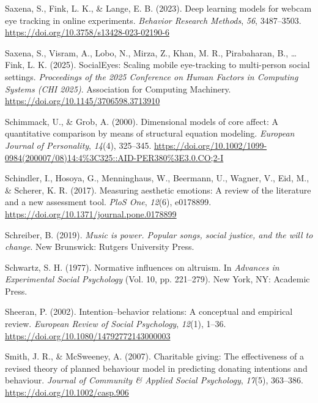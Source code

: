 \documentclass[
  man,floatsintext]{apa6}
\newlength{\cslhangindent}
\newenvironment{CSLReferences}[2] %
 {\begin{list}{}{%
  \setlength{\itemindent}{0pt}
  \setlength{\leftmargin}{0pt}
  \setlength{\parsep}{0pt}
  \ifodd #1
   \setlength{\leftmargin}{\cslhangindent}
   \setlength{\itemindent}{-1\cslhangindent}
  \fi
  \setlength{\itemsep}{#2\baselineskip}}}
 {\end{list}}
\begin{document}
\begin{CSLReferences}{1}{0}
Saxena, S., Fink, L. K., \& Lange, E. B. (2023). Deep learning models for webcam eye tracking in online experiments. \emph{Behavior Research Methods}, \emph{56}, 3487--3503. \url{https://doi.org/10.3758/s13428-023-02190-6}

Saxena, S., Visram, A., Lobo, N., Mirza, Z., Khan, M. R., Pirabaharan, B., \ldots{} Fink, L. K. (2025). {SocialEyes}: {Scaling} mobile eye-tracking to multi-person social settings. \emph{Proceedings of the 2025 {Conference} on {Human} {Factors} in {Computing} {Systems} ({CHI} 2025)}. Association for Computing Machinery. \url{https://doi.org/10.1145/3706598.3713910}

Schimmack, U., \& Grob, A. (2000). Dimensional models of core affect: A quantitative comparison by means of structural equation modeling. \emph{European Journal of Personality}, \emph{14}(4), 325--345. \url{https://doi.org/10.1002/1099-0984(200007/08)14:4\%3C325::AID-PER380\%3E3.0.CO;2-I}

Schindler, I., Hosoya, G., Menninghaus, W., Beermann, U., Wagner, V., Eid, M., \& Scherer, K. R. (2017). Measuring aesthetic emotions: {A} review of the literature and a new assessment tool. \emph{PloS One}, \emph{12}(6), e0178899. \url{https://doi.org/10.1371/journal.pone.0178899}

Schreiber, B. (2019). \emph{Music is power. {Popular} songs, social justice, and the will to change}. New Brunswick: Rutgers University Press.

Schwartz, S. H. (1977). Normative influences on altruism. In \emph{Advances in {Experimental} {Social} {Psychology}} (Vol. 10, pp. 221--279). New York, NY: Academic Press.

Sheeran, P. (2002). Intention--behavior relations: {A} conceptual and empirical review. \emph{European Review of Social Psychology}, \emph{12}(1), 1--36. \url{https://doi.org/10.1080/14792772143000003}

Smith, J. R., \& McSweeney, A. (2007). Charitable giving: {The} effectiveness of a revised theory of planned behaviour model in predicting donating intentions and behaviour. \emph{Journal of Community \& Applied Social Psychology}, \emph{17}(5), 363--386. \url{https://doi.org/10.1002/casp.906}


\end{CSLReferences}
\end{document}
